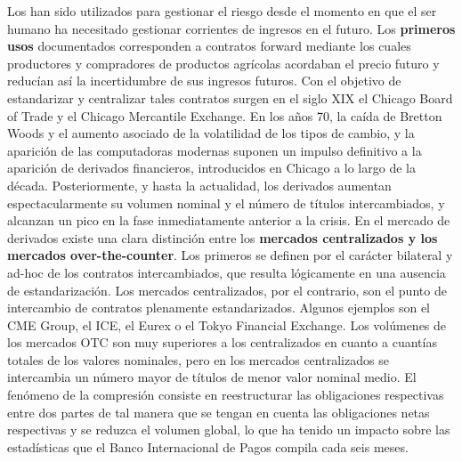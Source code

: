 \documentclass{nuevotema}
\begin{document}
Los  han sido utilizados para gestionar el riesgo desde el momento en que el ser humano ha necesitado gestionar corrientes de ingresos en el futuro. Los \textbf{primeros usos} documentados corresponden a contratos forward mediante los cuales productores y compradores de productos agrícolas acordaban el precio futuro y reducían así la incertidumbre de sus ingresos futuros. Con el objetivo de estandarizar y centralizar tales contratos surgen en el siglo XIX el Chicago Board of Trade y el Chicago Mercantile Exchange. En los años 70, la caída de Bretton Woods y el aumento asociado de la volatilidad de los tipos de cambio, y la aparición de las computadoras modernas suponen un impulso definitivo a la aparición de derivados financieros, introducidos en Chicago a lo largo de la década. Posteriormente, y hasta la actualidad, los derivados aumentan espectacularmente su volumen nominal y el número de títulos intercambiados, y alcanzan un pico en la fase inmediatamente anterior a la crisis. En el mercado de derivados existe una clara distinción entre los \textbf{mercados centralizados y los mercados over-the-counter}. Los primeros se definen por el carácter bilateral y ad-hoc de los contratos intercambiados, que resulta lógicamente en una ausencia de estandarización. Los mercados centralizados, por el contrario, son el punto de intercambio de contratos plenamente estandarizados. Algunos ejemplos son el CME Group, el ICE, el Eurex o el Tokyo Financial Exchange. Los volúmenes de los mercados OTC son muy superiores a los centralizados en cuanto a cuantías totales de los valores nominales, pero en los mercados centralizados se intercambia un número mayor de títulos de menor valor nominal medio. El fenómeno de la compresión consiste en reestructurar las obligaciones respectivas entre dos partes de tal manera que se tengan en cuenta las obligaciones netas respectivas y se reduzca el volumen global, lo que ha tenido un impacto sobre las estadísticas que el Banco Internacional de Pagos compila cada seis meses.
\end{document}
